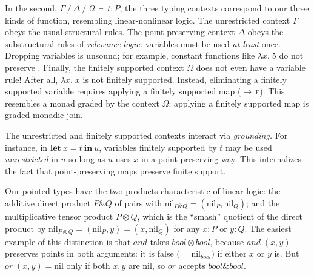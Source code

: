 \documentclass[sigplan, screen, dvipsnames]{acmart}
\newcommand\todo[1]{{\color{ACMRed}#1}}
\newcommand\name[1]{\ensuremath{\mathit{#1}}}
\newcommand\fnspace{\;}
\newcommand\fn[1]{\lambda{#1}.\fnspace}
\newcommand\<\;                 %
\newcommand\lto\multimap        %
\newcommand\fto{\rightarrow}    %
\newcommand\with{\mathbin{\&}}
\newcommand\ox\otimes
\newcommand\tbool{\name{bool}}
\newcommand\tmaybe[1]{\ensuremath{{#1}_{*}}}
\renewcommand\tmaybe[1]{\ensuremath{\name{maybe}~{#1}}}
\newcommand\G\Gamma
\newcommand\D\Delta
\renewcommand\O\Omega
\newcommand\cxsep{\mathbin{/}}
\newcommand\J[5]{{#3} \cxsep {#4} \cxsep {#5} \,\vdash\, {#1} : {#2}}
\newcommand\cname\text          %
\newcommand\cnil{\cname{nil}}
\newcommand\tnil\cnil
\newcommand\letin[2]{\textbf{let}~{#1}~\textbf{in}~{#2}}
\newcommand\leteq[3]{\letin{{#1} = {#2}}{#3}}
\begin{document}
In the second, $\J t P \G \D \O$, the three typing contexts correspond to our three kinds of function, resembling linear-nonlinear logic.
%
The unrestricted context $\G$ obeys the usual structural rules.
%
The point-preserving context $\D$ obeys the substructural rules of \emph{relevance logic:} variables must be used \emph{at least} once.
Dropping variables is unsound; for example, constant functions like $\fn x 5$ do not preserve \tnil.
%
Finally, the finitely supported context $\O$ does not even have a variable rule! After all, $\fn x x$ is not finitely supported.
%
Instead, eliminating a finitely supported variable requires applying a finitely supported map (\textsc{$\fto\,$e}).
This resembles a monad graded by the context $\O$; applying a finitely supported map is graded monadic join.

The unrestricted and finitely supported contexts interact via \emph{grounding.} For instance, in $\leteq x t u$, variables finitely supported by $t$ may be used \emph{unrestricted} in $u$ so long as $u$ uses $x$ in a point-preserving way.
This internalizes the fact that point-preserving maps preserve finite support.

Our pointed types have the two products characteristic of linear logic: the additive direct product $P \with Q$ of pairs with $\tnil_{P \with Q} = (\tnil_P, \tnil_Q)$; and the multiplicative tensor product $P \otimes Q$, which is the ``smash'' quotient of the direct product by $\tnil_{P \otimes Q} = (\tnil_P, y) = (x, \tnil_Q)$ for any $x : P$ or $y : Q$.
The easiest example of this distinction is that \name{and} takes $\tbool \ox \tbool$, because $\name{and} \<(x,y)$ preserves points in both arguments: it is false ($= \tnil_\tbool$) if either $x$ or $y$ is. But $\name{or} \<(x,y) = \tnil$ only if both $x,y$ are $\tnil$, so $\name{or}$ accepts $\tbool \with \tbool$.




\end{document}
